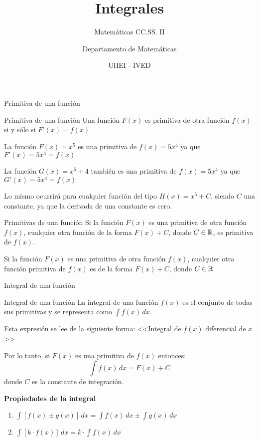\documentclass[8pt]{beamer}
\title{Integrales}
\subtitle{Matemáticas CC.SS. II}
\author{Departamento de Matemáticas}
\date[UHEI-IVED]{ UHEI - IVED}
\begin{document}
\titleframe
\begin{frame}
\tableofcontents
\end{frame}

\begin{frame}[t]{Primitiva de una función}
\begin{alertblock}{Primitiva de una función}
Una función $F(x)$ es primitiva de otra función $f(x)$ si y sólo si $F'(x)=f(x)$
\end{alertblock}

\pause
La función $F(x)=x^5$ es una primitiva de $f(x)=5x^4$ ya que $F'(x)=5x^4=f(x)$

\pause
La función $G(x)=x^5+4$ también es una primitiva de $f(x)=5x^4$ ya que $G'(x)=5x^4=f(x)$


\pause
Lo mismo ocurrirá para cualquier función del tipo $H(x)=x^5+C$, siendo $C$ una constante, ya que la derivada de una constante es cero.

\pause

\begin{alertblock}{Primitivas de una función}
Si la función $F(x)$ es una primitiva de otra función $f(x)$, cualquier otra función de la forma $F(x)+C$, donde $C \in \mathbb{R}$, es primitiva de $f(x)$.

\pause
Si la función $F(x)$ es una primitiva de otra función $f(x)$, cualquier otra función primitiva de $f(x)$ es de la forma $F(x)+C$, donde $C \in \mathbb{R}$
\end{alertblock}

\end{frame}

\begin{frame}[t]{Integral de una función}
\begin{alertblock}{Integral de una función}
La integral de una función $f(x)$ es el conjunto de todas sus primitivas y se representa como $\int f(x) \, dx$.

Esta expresión se lee de la siguiente forma: <<Integral de $f(x)$ diferencial de $x$>>

\pause
Por lo tanto, si $F(x)$ es una primitiva de $f(x)$ entonces:
\[ \int f(x)\,dx= F(x)+C \]
donde $C$ es la constante de integración.
\end{alertblock}

\textbf{Propiedades de la integral}

\pause
\begin{enumerate}
\item $\displaystyle \int \left[f(x) \pm g(x) \right]\,  dx = \int f(x)\, dx \pm \int g(x)\, dx $
\pause
\item $\displaystyle \int \left[k \cdot f(x) \right]\,  dx = k\cdot \int f(x)\, dx $
\end{enumerate}
\end{frame}
\end{document}
